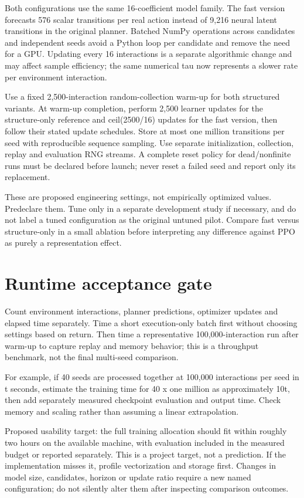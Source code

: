 \documentclass[11pt]{article}
\begin{document}
Both configurations use the same 16-coefficient model family. The fast version forecasts 576 scalar transitions per real action instead of 9,216 neural latent transitions in the original planner. Batched NumPy operations across candidates and independent seeds avoid a Python loop per candidate and remove the need for a GPU. Updating every 16 interactions is a separate algorithmic change and may affect sample efficiency; the same numerical tau now represents a slower rate per environment interaction.

Use a fixed 2,500-interaction random-collection warm-up for both structured variants. At warm-up completion, perform 2,500 learner updates for the structure-only reference and ceil(2500/16) updates for the fast version, then follow their stated update schedules. Store at most one million transitions per seed with reproducible sequence sampling. Use separate initialization, collection, replay and evaluation RNG streams. A complete reset policy for dead/nonfinite runs must be declared before launch; never reset a failed seed and report only its replacement.

These are proposed engineering settings, not empirically optimized values. Predeclare them. Tune only in a separate development study if necessary, and do not label a tuned configuration as the original untuned pilot. Compare fast versus structure-only in a small ablation before interpreting any difference against PPO as purely a representation effect.

\section{Runtime acceptance gate}

Count environment interactions, planner predictions, optimizer updates and elapsed time separately. Time a short execution-only batch first without choosing settings based on return. Then time a representative 100,000-interaction run after warm-up to capture replay and memory behavior; this is a throughput benchmark, not the final multi-seed comparison.

For example, if 40 seeds are processed together at 100,000 interactions per seed in t seconds, estimate the training time for 40 x one million as approximately 10t, then add separately measured checkpoint evaluation and output time. Check memory and scaling rather than assuming a linear extrapolation.

Proposed usability target: the full training allocation should fit within roughly two hours on the available machine, with evaluation included in the measured budget or reported separately. This is a project target, not a prediction. If the implementation misses it, profile vectorization and storage first. Changes in model size, candidates, horizon or update ratio require a new named configuration; do not silently alter them after inspecting comparison outcomes.
\end{document}
